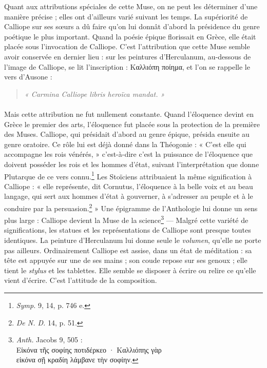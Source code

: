 \documentclass[a4paper, 11pt, oneside, polutonikogreek, french]{article}
\begin{document}
Quant aux attributions spéciales de cette Muse, on ne peut les déterminer d'une manière précise ; elles ont d'ailleurs varié suivant les temps. La supériorité de Calliope sur ses sœurs a dû faire qu'on lui donnât d'abord la présidence du genre poétique le plus important. Quand la poésie épique florissait en Grèce, elle était placée sous l'invocation de Calliope. C'est l'attribution que cette Muse semble avoir conservée en dernier lieu : sur les peintures d'Herculanum, au-dessous de l'image de Calliope, se lit l'inscription : Καλλιόπη ποίημα, et l'on se rappelle le vers d'Ausone :
\begin{quotation}
\emph{« Carmina Calliope libris heroïca mandat. »}
\end{quotation}
\paragraph{}
Mais cette attribution ne fut nullement constante. Quand l'éloquence devint en Grèce le premier des arts, l'éloquence fut placée sous la protection de la première des Muses. Calliope, qui présidait d'abord au genre épique, présida ensuite au genre oratoire. Ce rôle lui est déjà donné dans la Théogonie : « C'est elle qui accompagne les rois vénérés, » c'est-à-dire c'est la puissance de l'éloquence que doivent posséder les rois et les hommes d'état, suivant l'interprétation que donne Plutarque de ce vers connu.\footnote{\emph{Symp.} 9, 14, p. 746 e.} Les Stoïciens attribuaient la même signification à Calliope : « elle représente, dit Cornutus, l'éloquence à la belle voix et au beau langage, qui sert aux hommes d'état à gouverner, à s'adresser au peuple et à le conduire par la persuasion.\footnote{\emph{De N. D.} 14, p. 51.} » Une épigramme de l'Anthologie lui donne un sens plus large : Calliope devient la Muse de la science\footnote{\emph{Anth.} Jacobs 9, 505 :\\\hspace*{5mm}Εἰκόνα τῆς σοφίης ποτιδέρκεο · Καλλιόπης γὰρ\\\hspace*{5mm}εἰκόνα σῇ κραδίη λάμβανε τὴν σοφίην.} --- Malgré cette variété de significations, les statues et les représentations de Calliope sont presque toutes identiques. La peinture d'Herculanum lui donne seule le \emph{volumen}, qu'elle ne porte pas ailleurs. Ordinairement Calliope est assise, dans un état de méditation : sa tête est appuyée sur une de ses mains ; son coude repose sur ses genoux ; elle tient le \emph{stylus} et les tablettes. Elle semble se disposer à écrire ou relire ce qu'elle vient d'écrire. C'est l'attitude de la composition.
\clearpage
\end{document}
